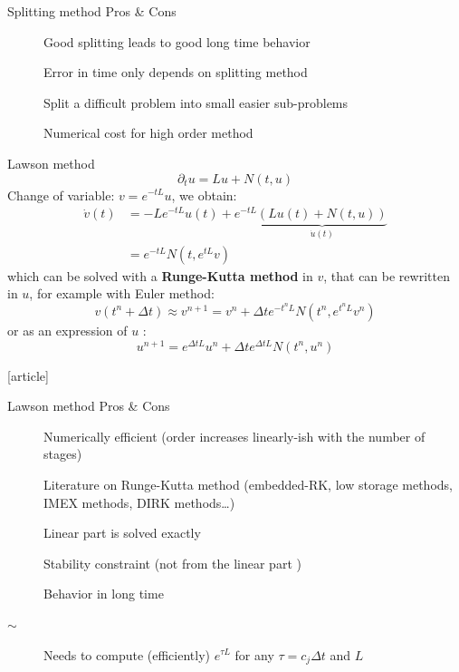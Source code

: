 \documentclass{beamer}
\newcommand{\cmark}{{\color{dgreen}\ding{52}}}
\newcommand{\xmark}{{\color{mred}\ding{55}}}
\newcommand{\bmark}{{\color{morange}$\sim$}}
\newcommand{\mbold}[1]{{\textbf{\color{PLB}#1}}}
\newcommand{\customcite}[1]{\cite{#1}}
\begin{document}
\begin{frame}{Splitting method}
  {Pros \& Cons}
  \begin{description}
    \item[\cmark] Good splitting leads to good long time behavior
    \item[\cmark] Error in time only depends on splitting method
    \item[\cmark] Split a difficult problem into small easier sub-problems
    \item[\xmark] Numerical cost for high order method
  \end{description}
  
\end{frame}

\begin{frame}{Lawson method}
  $$
    \partial_t u = Lu + N(t,u)
  $$
  Change of variable: \mbold{$v = e^{-tL}u$}, we obtain:
  $$
    \begin{aligned}
      \dot{v}(t) &= -Le^{-tL}u(t) + e^{-tL}\underbrace{\left(Lu(t) + N(t,u)\right)}_{\dot{u}(t)} \\
                 &= e^{-tL}N(t,e^{tL}v)
    \end{aligned}
  $$
  which can be solved with a \mbold{Runge-Kutta method} in $v$, that can be rewritten in $u$, for example with Euler method:
  $$
    v(t^n+\Delta t) \approx v^{n+1} = v^n + \Delta t e^{-t^nL}N(t^n,e^{t^nL}v^n)
  $$
  or as an expression of $u$ :
  $$
    u^{n+1} = e^{\Delta t L}u^n + \Delta te^{\Delta t L}N(t^n,u^n)
  $$
  \begin{thebibliography}{9}
    [article]
     \customcite{Lawson:1967a} \vspace{-0.25cm}
     \customcite{Hochbruck:2010} \vspace{-0.25cm}
     \customcite{Hochbruck:2020}
  \end{thebibliography}
\end{frame}
\begin{frame}{Lawson method}
  {Pros \& Cons}
  \begin{description}
    \item[\cmark] Numerically efficient (order increases linearly-ish with the number of stages)
    \item[\cmark] Literature on Runge-Kutta method (embedded-RK, low storage methods, IMEX methods, DIRK methods\dots)
    \item[\cmark] Linear part is solved exactly
    \item[\xmark] Stability constraint (not from the linear part \cmark)
    \item[\xmark] Behavior in long time
    \item[\bmark] Needs to compute (efficiently) $e^{\tau L}$ for any $\tau=c_j\Delta t$ and $L$
  \end{description}
\end{frame}
\end{document}
